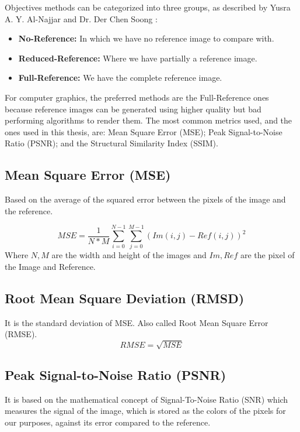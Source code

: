 \documentclass{cslthse-msc}
\begin{document}
Objectives methods can be categorized into three groups, as described by Yusra A. Y. Al-Najjar and Dr. Der Chen Soong \cite{Yusra2012}:

\begin{itemize}
	\item \textbf{No-Reference:} In which we have no reference image to compare with.
	\item \textbf{Reduced-Reference:} Where we have partially a reference image.
	\item \textbf{Full-Reference:} We have the complete reference image.
\end{itemize}

For computer graphics, the preferred methods are the Full-Reference ones because reference images can be generated using higher quality but bad performing algorithms to render them. The most common metrics used, and the ones used in this thesis, are: Mean Square Error (MSE); Peak Signal-to-Noise Ratio (PSNR); and the Structural Similarity Index (SSIM).

\subsection{Mean Square Error (MSE)}
Based on the average of the squared error between the pixels of the image and the reference.

\begin{equation}\label{eq:mse}
	MSE=\frac{1}{N*M}\sum\limits_{i=0}^{N-1}\sum\limits_{j=0}^{M-1}(Im(i,j)-Ref(i,j))^2
\end{equation}
Where $N,M$ are the width and height of the images and $Im,Ref$ are the pixel of the Image and Reference.

\subsection{Root Mean Square Deviation (RMSD)}
It is the standard deviation of MSE. Also called Root Mean Square Error (RMSE).
\begin{equation}\label{eq:rmse}
RMSE=\sqrt{MSE}
\end{equation}

\subsection{Peak Signal-to-Noise Ratio (PSNR)}
It is based on the mathematical concept of Signal-To-Noise Ratio (SNR) which measures the signal of the image, which is stored as the colors of the pixels for our purposes, against its error compared to the reference. \cite{Yusra2012}
\end{document}
